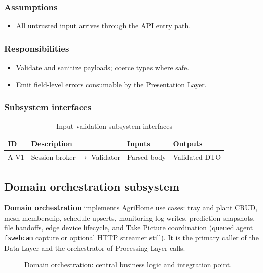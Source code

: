 \subsubsection{Assumptions}
\begin{itemize}
  \item All untrusted input arrives through the API entry path.
\end{itemize}

\subsubsection{Responsibilities}
\begin{itemize}
  \item Validate and sanitize payloads; coerce types where safe.
  \item Emit field-level errors consumable by the Presentation Layer.
\end{itemize}

\subsubsection{Subsystem interfaces}
\begin{table}[H]
\centering
\small
\begin{tabular}{|p{0.9cm}|p{3.4cm}|p{3.0cm}|p{3.5cm}|}
\hline
\textbf{ID} & \textbf{Description} & \textbf{Inputs} & \textbf{Outputs} \\
\hline
A-V1 & Session broker $\rightarrow$ Validator & Parsed body & Validated DTO \\
\hline
\end{tabular}
\caption{Input validation subsystem interfaces}
\end{table}

\subsection{Domain orchestration subsystem}

\textbf{Domain orchestration} implements AgriHome use cases: tray and plant CRUD, mesh membership, schedule upserts, monitoring log writes, prediction snapshots, file handoffs, edge device lifecycle, and Take Picture coordination (queued agent \texttt{fswebcam} capture or optional HTTP streamer still). It is the primary caller of the Data Layer and the orchestrator of Processing Layer calls.

\begin{figure}[H]
\centering
{}
\caption{Domain orchestration: central business logic and integration point.}
\label{fig:app-dom}
\end{figure}


